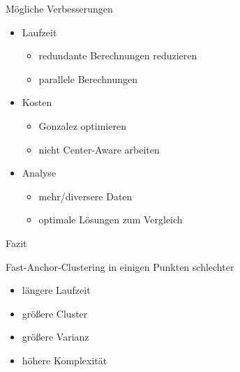\begin{frame}{Mögliche Verbesserungen}
    \begin{large}
        \begin{itemize}
        \item Laufzeit
        \begin{itemize}
            \item redundante Berechnungen reduzieren
            \item parallele Berechnungen
        \end{itemize}
        \item Kosten
        \begin{itemize}
            \item Gonzalez optimieren
            \item nicht Center-Aware arbeiten
        \end{itemize}
        \item Analyse
        \begin{itemize}
            \item mehr/diversere Daten
            \item optimale Lösungen zum Vergleich
        \end{itemize}
    \end{itemize}
    \end{large}
    
\end{frame}












\begin{frame}{Fazit}
    \begin{large}
        Fast-Anchor-Clustering in einigen Punkten schlechter
    \end{large}
        \begin{itemize}
            \item längere Laufzeit
            \item größere Cluster
            \item größere Varianz
            \item höhere Komplexität
        \end{itemize}    
\end{frame}



